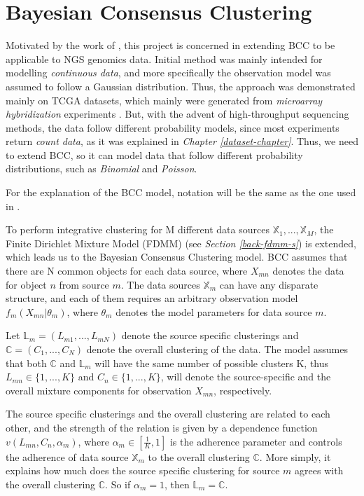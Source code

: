 \section{Bayesian Consensus Clustering} \label{integr-bcc-sect}
Motivated by the work of \citet{Lock2013}, this project is concerned in extending BCC to be applicable to NGS genomics data. Initial method was mainly intended for modelling \emph{continuous data}, and more specifically the observation model was assumed to follow a Gaussian distribution. Thus, the approach was demonstrated mainly on TCGA datasets, which mainly were generated from \emph{microarray hybridization} experiments \citep{Babu2004}. But, with the advent of high-throughput sequencing methods, the data follow different probability models, since most experiments return \emph{count data}, as it was explained in \emph{Chapter \ref{dataset-chapter}}. Thus, we need to extend BCC, so it can model data that follow different probability distributions, such as \emph{Binomial} and \emph{Poisson}.

For the explanation of the BCC model, notation will be the same as the one used in \citet{Lock2013}. 

To perform integrative clustering for M different data sources $\mathbb{X}_{1},..., \mathbb{X}_{M}$, the Finite Dirichlet Mixture Model (FDMM) (see \emph{Section \ref{back-fdmm-s}}) is extended, which leads us to the Bayesian Consensus Clustering model. BCC assumes that there are N common objects for each data source, where $X_{mn}$ denotes the data for object $n$ from source $m$. The data sources $\mathbb{X}_{m}$ can have any disparate structure, and each of them requires an arbitrary observation model $f_{m}(X_{mn}|\theta_{m})$, where $\theta_{m}$ denotes the model parameters for data source $m$.

Let $\mathbb{L}_{m} = (L_{m1},...,L_{mN})$ denote the source specific clusterings and $\mathbb{C} = (C_{1},...,C_{N})$ denote the overall clustering of the data. The model assumes that both $\mathbb{C}$ and $\mathbb{L}_{m}$ will have the same number of possible clusters K, thus $L_{mn} \in \lbrace 1,...,K \rbrace$ and $C_{n} \in \lbrace 1,...,K \rbrace$, will denote the source-specific and the overall mixture components for observation $X_{mn}$, respectively.

The source specific clusterings and the overall clustering are related to each other, and the strength of the relation is given by a dependence function $v(L_{mn}, C_{n}, \alpha_{m})$, where $\alpha_{m} \in [\frac{1}{K}, 1]$ is the adherence parameter and controls the adherence of data source $\mathbb{X}_m$ to the overall clustering $\mathbb{C}$. More simply, it explains how much does the source specific clustering for source $m$ agrees with the overall clustering $\mathbb{C}$. So if $\alpha_{m} = 1$, then $\mathbb{L}_{m} = \mathbb{C}$. 

